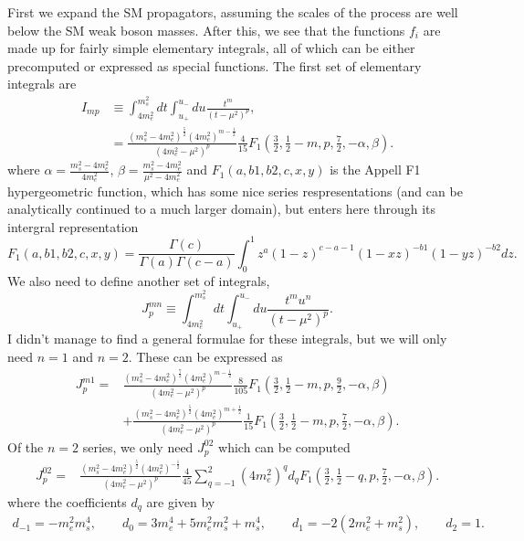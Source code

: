 \documentclass[11pt, a4paper]{article}
\begin{document}
First we expand the SM propagators, assuming the scales of the process are well
below the SM weak boson masses. After this, we see that the functions $f_i$ are
made up for fairly simple elementary integrals, all of which can be either
precomputed or expressed as special functions. The first set of elementary
integrals are
%
\begin{align*}  I_{mp} &\equiv \int^{m_s^2}_{4m_e^2} dt \int_{u_+}^{u_-} du
\frac{t^m}{(t-\mu^2)^p},\\ &=
\frac{\left(m_s^2-4m_e^2\right)^\frac{5}{2}\left(4m_e^2\right)^{m-\frac{1}{2}}}{\left(4m_e^2-\mu^2\right)^p}\frac{4}{15}F_1\left(\frac{3}{2},\frac{1}{2}-m,p,\frac{7}{2},-\alpha,\beta\right).
\end{align*}
%
where $\alpha = \frac{m_s^2-4m_e^2}{4m_e^2} $, $\beta =\frac{m_s^2-4m_e^2}{\mu^2-4m_e^2} $ and $F_1(a,b1,b2,c,x,y)$ is the Appell F1 hypergeometric function, which has some nice series 
respresentations (and can be analytically continued to a much larger domain), but enters here through its intergral representation
%
\[  F_1(a,b1,b2,c,x,y) = \frac{\Gamma\left(c\right)}{\Gamma\left(a\right)\Gamma\left(c-a\right)}\int_0^1 z^a(1-z)^{c-a-1}(1-xz)^{-b1} (1-yz)^{-b2}dz. \]
%
We also need to define another set of integrals, 
%
\[   J^{mn}_{p} \equiv \int_{4m_e^2}^{m_s^2}dt \int_{u_+}^{u_-}du \frac{t^m
u^n}{(t-\mu^2)^p}. \]
%
I didn't manage to find a general formulae for these integrals, but we will
only need $n=1$ and $n=2$. These can be expressed as
%
\begin{align*}
%
J^{m1}_p =
&\frac{\left(m_s^2-4m_e^2\right)^\frac{7}{2}\left(4m_e^2\right)^{m-\frac{1}{2}}}{\left(4m_e^2-\mu^2\right)^p}\frac{8}{105}F_1\left(\frac{3}{2},\frac{1}{2}-m,p,\frac{9}{2},-\alpha,\beta\right)\\ 
%
&+
\frac{\left(m_s^2-4m_e^2\right)^\frac{5}{2}\left(4m_e^2\right)^{m+\frac{1}{2}}}{\left(4m_e^2-\mu^2\right)^p}\frac{1}{15}F_1\left(\frac{3}{2},\frac{1}{2}-m,p,\frac{7}{2},-\alpha,\beta\right).
%
\end{align*}
%
Of the $n=2$ series, we only need $J^{02}_p$ which can be computed 
%
\begin{align*} J^{02}_p =
&\frac{\left(m_s^2-4m_e^2\right)^\frac{5}{2}\left(4m_e^2\right)^{-\frac{1}{2}}}{\left(4m_e^2-\mu^2\right)^p}
\frac{4}{45}\sum_{q=-1}^2\left(4m_e^2\right)^q d_q
F_1\left(\frac{3}{2},\frac{1}{2}-q,p,\frac{7}{2},-\alpha,\beta\right).
\end{align*}
%
where the coefficients $d_q$ are given by 
%
\begin{align*} d_{-1} = -m_e^2m_s^4,\qquad d_{0} = 3m_e^4 + 5m_e^2m_s^2 +
m_s^4,\qquad d_{1} = -2(2m_e^2 +m_s^2),\qquad d_{2} = 1.  \end{align*}
\end{document}
